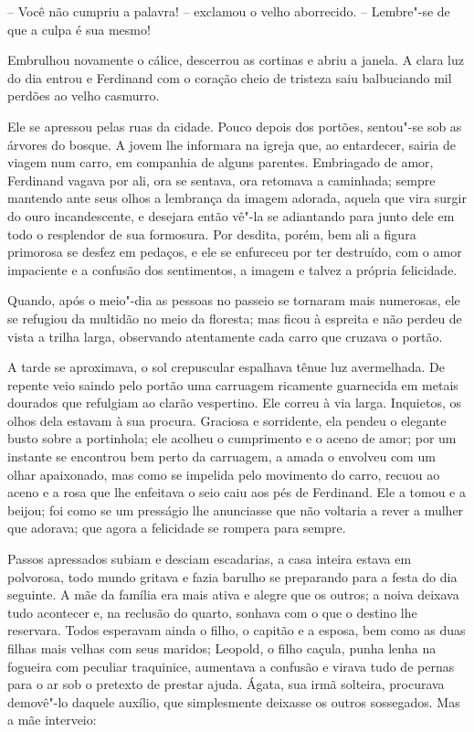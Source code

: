 -- Você não cumpriu a palavra! -- exclamou o velho aborrecido. --
Lembre"-se de que a culpa é sua mesmo!

Embrulhou novamente o cálice, descerrou as cortinas e abriu a janela. A
clara luz do dia entrou e Ferdinand com o coração cheio de tristeza
saiu balbuciando mil perdões ao velho casmurro.  

 Ele se apressou pelas ruas da cidade. Pouco depois dos portões,
sentou"-se sob as árvores do bosque. A jovem lhe informara na igreja
que, ao entardecer, sairia de viagem num carro, em companhia de alguns
parentes. Embriagado de amor, Ferdinand vagava por ali, ora se sentava,
ora retomava a caminhada; sempre mantendo ante seus olhos a lembrança
da imagem adorada, aquela que vira surgir do ouro incandescente, e
desejara então vê"-la se adiantando para junto dele em todo o resplendor
de sua formosura. Por desdita, porém, bem ali a figura primorosa se
desfez em pedaços, e ele se enfureceu por ter destruído, com o amor
impaciente e a confusão dos sentimentos, a imagem e talvez a própria
felicidade. 

Quando, após o meio"-dia as pessoas no passeio se tornaram mais
numerosas, ele se refugiou da multidão no meio da floresta; mas ficou à
espreita e não perdeu de vista a trilha larga, observando atentamente
cada carro que cruzava o portão.

A tarde se aproximava, o sol crepuscular espalhava tênue luz
avermelhada. De repente veio saindo pelo portão uma carruagem ricamente
guarnecida em metais dourados que refulgiam ao clarão vespertino. Ele
correu à via larga. Inquietos, os olhos dela estavam à sua procura.
Graciosa e sorridente, ela pendeu o elegante busto sobre a portinhola;
ele acolheu o cumprimento e o aceno de amor; por um instante se
encontrou bem perto da carruagem, a amada o envolveu com um olhar
apaixonado, mas como se impelida pelo \mbox{movimento} do carro, recuou ao
aceno e a rosa que lhe enfeitava o seio caiu aos pés de Ferdinand. Ele
a tomou e a beijou; foi como se um presságio lhe anunciasse que não
voltaria a rever a mulher que adorava; que agora a felicidade se
rompera para sempre. 

\asterisc

Passos apressados subiam e desciam escadarias, a casa inteira estava em
polvorosa, todo mundo gritava e fazia barulho se preparando para a
festa do dia seguinte. A mãe da família era mais ativa e alegre que os
outros; a noiva deixava tudo acontecer e, na reclusão do quarto,
sonhava com o que o destino lhe reservara. Todos
esperavam ainda o filho, o capitão e a esposa, bem como as duas filhas
mais velhas com seus maridos; Leopold, o filho caçula, punha lenha na
fogueira com peculiar traquinice, aumentava a confusão e virava tudo de
pernas para o ar sob o pretexto de prestar ajuda. Ágata, sua irmã
solteira, procurava demovê"-lo daquele auxílio, que simplesmente
deixasse os outros sossegados. Mas a mãe interveio:

